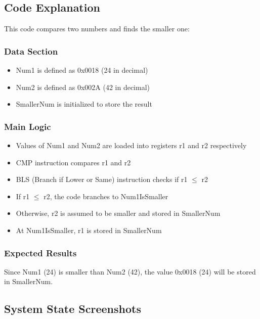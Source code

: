 \documentclass[12pt,a4paper]{article}
\begin{document}
\subsection{Code Explanation}
This code compares two numbers and finds the smaller one:

\subsubsection{Data Section}
\begin{itemize}
    \item Num1 is defined as 0x0018 (24 in decimal)
    \item Num2 is defined as 0x002A (42 in decimal)
    \item SmallerNum is initialized to store the result
\end{itemize}

\subsubsection{Main Logic}
\begin{itemize}
    \item Values of Num1 and Num2 are loaded into registers r1 and r2 respectively
    \item CMP instruction compares r1 and r2
    \item BLS (Branch if Lower or Same) instruction checks if r1 $\leq$ r2
    \item If r1 $\leq$ r2, the code branches to Num1IsSmaller
    \item Otherwise, r2 is assumed to be smaller and stored in SmallerNum
    \item At Num1IsSmaller, r1 is stored in SmallerNum
\end{itemize}

\subsubsection{Expected Results}
Since Num1 (24) is smaller than Num2 (42), the value 0x0018 (24) will be stored in SmallerNum.

\subsection{System State Screenshots}
\end{document}
